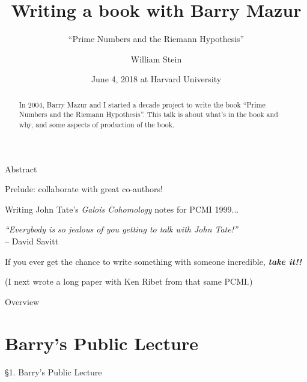 \documentclass{beamer}
\title{Writing a book with Barry Mazur}
\subtitle{``Prime Numbers and the Riemann Hypothesis''}
\author[W.\thinspace{}Stein]{William Stein}
\date[Mazur 80]{June 4, 2018 at Harvard University}
\institute[SageMath, Inc. \& UW]{SageMath, Inc. and University of Washington}
\newcommand{\mysection}[2]{\section{#2}%
\begin{frame}{}
\vfill
\begin{center}
\hrulefill
\vfill
\Huge\sc \S#1. #2
\vfill
\hrulefill
\end{center}
\vfill
\end{frame}}
\begin{document}
\begin{frame}
  \titlepage
\end{frame}

\begin{frame}{Abstract}
  \begin{abstract}
    In 2004, Barry Mazur and I started a decade project to write the
    book ``Prime Numbers and the Riemann Hypothesis''.
    This talk is about
    what's in the book and why, and some aspects
    of production of the book.
  \end{abstract}
\end{frame}

\begin{frame}{Prelude: collaborate with great co-authors!}

Writing John Tate's {\em Galois Cohomology} notes for PCMI 1999...

\vfill

\begin{block}{}
{\em
``Everybody is so jealous of you getting
to talk with John Tate!''}\\
 -- David Savitt
  \end{block}
  
\vfill

If you ever get the chance
to write something with someone incredible,
{\bf\em take it!!}

\vfill

(I next wrote a long paper with Ken Ribet from that same PCMI.)

\end{frame}


\begin{frame}{Overview}
  \tableofcontents
\end{frame}

\mysection{1}{Barry's Public Lecture}
\end{document}
